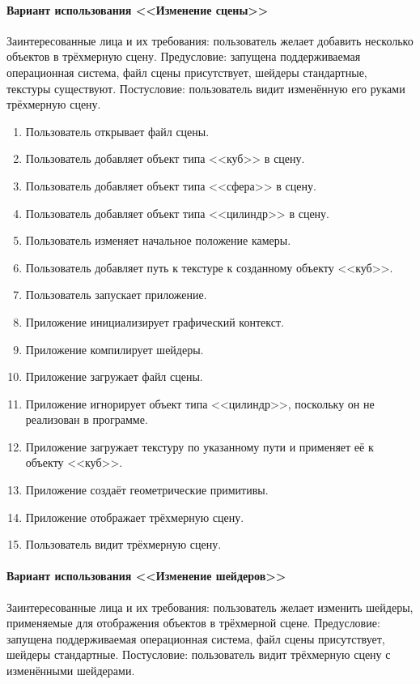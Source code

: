 \paragraph{Вариант использования <<Изменение сцены>>}

Заинтересованные лица и их требования: пользователь желает добавить несколько объектов в трёхмерную сцену. Предусловие: запущена поддерживаемая операционная система, файл сцены присутствует, шейдеры стандартные, текстуры существуют. Постусловие: пользователь видит изменённую его руками трёхмерную сцену.

\begin{enumerate}
    \item Пользователь открывает файл сцены.
    \item Пользователь добавляет объект типа <<куб>> в сцену.
    \item Пользователь добавляет объект типа <<сфера>> в сцену.
    \item Пользователь добавляет объект типа <<цилиндр>> в сцену.
    \item Пользователь изменяет начальное положение камеры.
    \item Пользователь добавляет путь к текстуре к созданному объекту <<куб>>.
    \item Пользователь запускает приложение.
    \item Приложение инициализирует графический контекст.
    \item Приложение компилирует шейдеры.
    \item Приложение загружает файл сцены.
    \item Приложение игнорирует объект типа <<цилиндр>>, поскольку он не реализован в программе.
    \item Приложение загружает текстуру по указанному пути и применяет её к объекту <<куб>>.
    \item Приложение создаёт геометрические примитивы.
    \item Приложение отображает трёхмерную сцену.
    \item Пользователь видит трёхмерную сцену.
\end{enumerate}

\paragraph{Вариант использования <<Изменение шейдеров>>}

Заинтересованные лица и их требования: пользователь желает изменить шейдеры, применяемые для отображения объектов в трёхмерной сцене. Предусловие: запущена поддерживаемая операционная система, файл сцены присутствует, шейдеры стандартные. Постусловие: пользователь видит трёхмерную сцену с изменёнными шейдерами.

